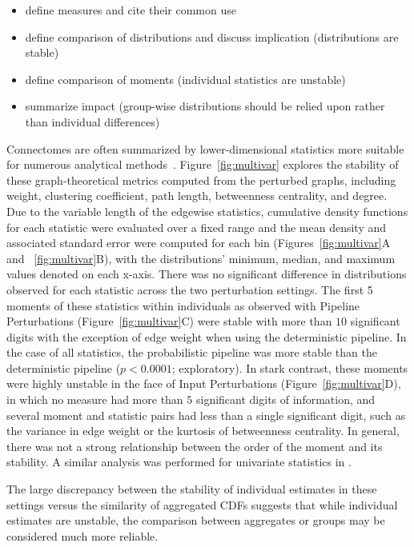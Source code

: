 \documentclass[fleqn,10pt]{SelfArx} %
\begin{document}
\begin{itemize}
\item define measures and cite their common use
\item define comparison of distributions and discuss implication (distributions are stable)
\item define comparison of moments (individual statistics are unstable)
\item summarize impact (group-wise distributions should be relied upon rather than individual differences)
\end{itemize}

Connectomes are often summarized by lower-dimensional statistics more suitable for numerous analytical
methods~\cite{Rubinov2010-fh}. Figure~\ref{fig:multivar} explores the stability of these graph-theoretical metrics
computed from the perturbed graphs, including weight, clustering coefficient, path length, betweenness centrality, and
degree. Due to the variable length of the edgewise statistics, cumulative density functions for each statistic were
evaluated over a fixed range and the mean density and associated standard error were computed for each bin
(Figures~\ref{fig:multivar}A and ~\ref{fig:multivar}B), with the distributions' minimum, median, and maximum values
denoted on each x-axis. There was no significant difference in distributions observed for each statistic across the two
perturbation settings. The first 5 moments of these statistics within individuals as observed with Pipeline
Perturbations (Figure~\ref{fig:multivar}C) were stable with more than $10$ significant digits with the exception of
edge weight when using the deterministic pipeline. In the case of all statistics, the probabilistic pipeline was more
stable than the deterministic pipeline ($p < 0.0001$; exploratory). In stark contrast, these moments were highly
unstable in the face of Input Perturbations (Figure~\ref{fig:multivar}D), in which no measure had more than $5$
significant digits of information, and several moment and statistic pairs had less than a single significant digit,
such as the variance in edge weight or the kurtosis of betweenness centrality. In general, there was not a strong
relationship between the order of the moment and its stability. A similar analysis was performed for univariate
statistics in .

The large discrepancy between the stability of individual estimates in these settings versus the similarity of
aggregated CDFs suggests that while individual estimates are unstable, the comparison between aggregates or groups may
be considered much more reliable.
\end{document}
